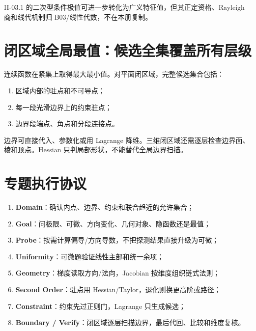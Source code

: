 \documentclass[11pt,a4paper,fontset=fandol]{ctexart}
\newcommand{\kw}[1]{\textbf{\color{deep}#1}}
\begin{document}
II-03.1 的二次型条件极值可进一步转化为广义特征值，但其正定资格、Rayleigh 商和线代机制归 B03/线性代数，不在本册复制。

\section{闭区域全局最值：候选全集覆盖所有层级}

连续函数在紧集上取得最大最小值。对平面闭区域，完整候选集合包括：
\begin{enumerate}
  \item 区域内部的驻点和不可导点；
  \item 每一段光滑边界上的约束驻点；
  \item 边界段端点、角点和分段连接点。
\end{enumerate}
边界可直接代入、参数化或用 Lagrange 降维。三维闭区域还需逐层检查边界面、棱和顶点。Hessian 只判局部形状，不能替代全局边界扫描。

\section{专题执行协议}
\begin{enumerate}
  \item \kw{Domain}：确认内点、边界、约束和联合趋近的允许集合；
  \item \kw{Goal}：问极限、可微、方向变化、几何对象、隐函数还是最值；
  \item \kw{Probe}：按需计算偏导/方向导数，不把探测结果直接升级为可微；
  \item \kw{Uniformity}：可微题验证线性主部和统一余项；
  \item \kw{Geometry}：梯度读取方向/法向，Jacobian 按维度组织链式法则；
  \item \kw{Second Order}：驻点用 Hessian/Taylor，退化则换更高阶或路径；
  \item \kw{Constraint}：约束先过正则门，Lagrange 只生成候选；
  \item \kw{Boundary / Verify}：闭区域逐层扫描边界，最后代回、比较和维度复核。
\end{enumerate}
\end{document}
